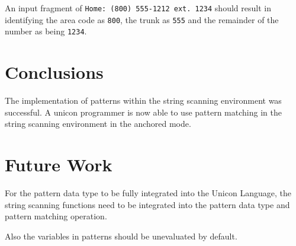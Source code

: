 \documentclass{article}
\begin{document}
An input fragment of \texttt{Home: (800) 555-1212 ext. 1234} should result in identifying the area code as \texttt{800}, the trunk as \texttt{555} and the remainder of the number as being \texttt{1234}.

\section{Conclusions}
The implementation of patterns within the string scanning environment was successful.  A unicon programmer is now able to use pattern matching in the string scanning environment in the anchored mode.

\section{Future Work}
For the pattern data type to be fully integrated into the Unicon Language, the string scanning functions need to be integrated into the pattern data type and pattern matching operation.  

Also the variables in patterns should be unevaluated by default.

\pagebreak


\end{document}
